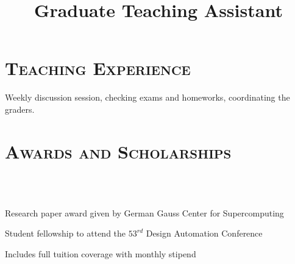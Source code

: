 \begin{resume}
	
	\section{\textsc{Teaching Experience}}
	
	\title{Graduate Teaching Assistant}
	\begin{position}
		Weekly discussion session, checking exams and homeworks, coordinating the
    graders.  
	\end{position}
	
	
	\section{\textsc{Awards and Scholarships}}
	
	\begin{formatb}
		\\
		\body\\
	\end{formatb}

  \begin{position}
    Research paper award given by German Gauss Center for Supercomputing
  \end{position}

  \begin{position}
    Student fellowship to attend the $53^{rd}$ Design Automation Conference
  \end{position}
	
	\begin{position}
		Includes full tuition coverage with monthly stipend
	\end{position}
	

\end{resume}
